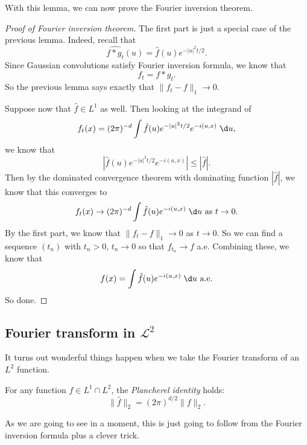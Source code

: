 \documentclass[a4paper]{article}
\begin{document}
With this lemma, we can now prove the Fourier inversion theorem.
\begin{proof}[Proof of Fourier inversion theorem]
  The first part is just a special case of the previous lemma. Indeed, recall that
  \[
    \widehat{f * g_t} (u) = \hat{f}(u) e^{-|u|^2 t/2}.
  \]
  Since Gaussian convolutions satisfy Fourier inversion formula, we know that
  \[
    f_t = f * g_t.
  \]
  So the previous lemma says exactly that $\|f_t - f\|_1 \to 0$.

  Suppose now that $\hat{f} \in L^1$ as well. Then looking at the integrand of
  \[
    f_t(x) = (2\pi)^{-d} \int \hat{f}(u) e^{-|u|^2t/2} e^{-i(u, x)}\;\d u,
  \]
  we know that
  \[
    \left| \hat{f}(u) e^{-|u|^2t/2} e^{-i(u, x)}\right| \leq |\hat{f}|.
  \]
  Then by the dominated convergence theorem with dominating function $|\hat{f}|$, we know that this converges to
  \[
    f_t(x) \to (2\pi)^{-d} \int \hat{f}(u) e^{-i(u, x)}\;\d u\text{ as }t \to 0.
  \]
  By the first part, we know that $\|f_t - f\|_1 \to 0$ as $t \to 0$. So we can find a sequence $(t_n)$ with $t_n > 0$, $t_n \to 0$ so that $f_{t_n} \to f$ a.e. Combining these, we know that
  \[
    f(x) = \int \hat{f}(u) e^{-i(u, x)}\;\d u \text{ a.e.}
  \]
  So done.
\end{proof}

\subsection{Fourier transform in \texorpdfstring{$\mathcal{L}^2$}{L2}}
It turns out wonderful things happen when we take the Fourier transform of an $L^2$ function.
\begin{thm}
  For any function $f \in L^1 \cap L^2$, the \emph{Plancherel identity} holds:
  \[
    \|\hat{f}\|_2 = (2\pi)^{d/2} \|f\|_2.
  \]
\end{thm}
As we are going to see in a moment, this is just going to follow from the Fourier inversion formula plus a clever trick.
\end{document}
